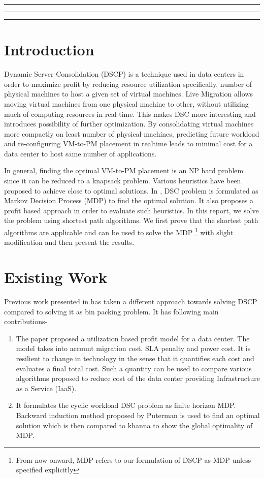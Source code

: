 \documentclass[a4paper,12pt]{article}
\begin{document}

\tableofcontents
\vspace{0.5cm}
\hrule \hrule \hrule
\newpage

\section{Introduction}
Dynamic Server Consolidation (DSCP) is a technique used in data centers in order to maximize profit by reducing resource utilization specifically, number of physical machines to host a given set of virtual machines. Live Migration \cite{live_migration} allows moving virtual machines from one physical machine to other, without utilizing much of computing resources in real time. This makes DSC more interesting and introduces possibility of further optimization. By consolidating virtual machines more compactly on least number of physical machines, predicting future workload and re-configuring VM-to-PM placement in realtime leads to minimal cost for a data center to host same number of applications.

In general, finding the optimal VM-to-PM placement is an NP hard problem since it can be reduced to a knapsack problem. Various heuristics have been proposed to achieve close to optimal solutions. In \cite{ieee_mdp}, DSC problem is formulated as Markov Decision Process (MDP) to find the optimal solution. It also proposes a profit based approach in order to evaluate such heuristics. In this report, we solve the problem using shortest path algorithms. We first prove that the shortest path algorithms are applicable and can be used to solve the MDP \footnote{From now onward, MDP refers to our formulation of DSCP as MDP unless
specified explicitly} with slight modification and then present the results.

\section{Existing Work}
Previous work presented in \cite{ieee_mdp} has taken a different approach towards solving DSCP compared to solving it as bin packing problem. It has following main contributions-
\begin{enumerate}
\item The paper proposed a utilization based profit model for a data center. The model takes into account migration cost, SLA penalty and power cost. It is resilient to change in technology in the sense that it quantifies each cost and evaluates a final total cost. Such a quantity can be used to compare various algorithms proposed to reduce cost of the data center providing Infrastructure as a Service (IaaS).
\item It formulates the cyclic workload DSC problem as finite horizon MDP. Backward induction method proposed by Puterman is used to find an optimal solution which is then compared to khanna \cite{khanna} to show the global optimality of MDP.
\end{enumerate}
\end{document}
